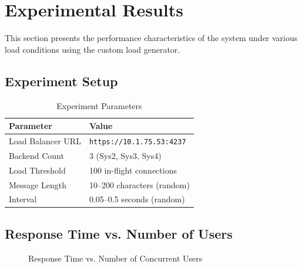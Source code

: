 \documentclass[12pt, a4paper]{article}
\begin{document}
\section{Experimental Results}

This section presents the performance characteristics of the system under various load conditions using the custom load generator.

\subsection{Experiment Setup}

\begin{table}[H]
\centering
\caption{Experiment Parameters}
\label{tab:exp-params}
\begin{tabular}{ll}
\toprule
\textbf{Parameter} & \textbf{Value} \\
\midrule
Load Balancer URL & \texttt{https://10.1.75.53:4237} \\
Backend Count & 3 (Sys2, Sys3, Sys4) \\
Load Threshold & 100 in-flight connections \\
Message Length & 10--200 characters (random) \\
Interval & 0.05--0.5 seconds (random) \\
\bottomrule
\end{tabular}
\end{table}

\subsection{Response Time vs. Number of Users}

\begin{figure}[H]
\centering
{}
\caption{Response Time vs. Number of Concurrent Users}
\label{fig:response-time}
\end{figure}
\end{document}

